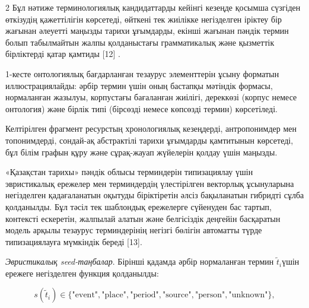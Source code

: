 \begin{multicols}{2}
Бұл нәтиже терминологиялық кандидаттарды кейінгі кезеңде қосымша
сүзгіден өткізудің қажеттілігін көрсетеді, өйткені тек жиілікке
негізделген іріктеу бір жағынан әлеуетті маңызды тарихи ұғымдарды,
екінші жағынан пәндік термин болып табылмайтын жалпы қолданыстағы
грамматикалық және қызметтік бірліктерді қатар қамтиды {[}12{]} .

1-кесте онтологиялық бағдарланған тезаурус элементтерін ұсыну форматын
иллюстрациялайды: әрбір термин үшін оның бастапқы мәтіндік формасы,
нормаланған жазылуы, корпустағы бағаланған жиілігі, дереккөзі (корпус
немесе онтология) және бірлік типі (бірсөзді немесе көпсөзді термин)
көрсетіледі.

Келтірілген фрагмент ресурстың хронологиялық кезеңдерді, антропонимдер
мен топонимдерді, сондай-ақ абстрактілі тарихи ұғымдарды қамтитынын
көрсетеді, бұл білім графын құру және сұрақ-жауап жүйелерін қолдау үшін
маңызды.

«Қазақстан тарихы» пәндік облысы терминдерін типизациялау үшін
эвристикалық ережелер мен терминдердің үлестірілген векторлық
ұсынуларына негізделген қадағаланатын оқытуды біріктіретін әлсіз
бақыланатын гибридті сұлба қолданылды. Бұл тәсіл тек шаблондық
ережелерге сүйенуден бас тартып, контексті ескеретін, жалпылай алатын
және белгісіздік деңгейін басқаратын модель арқылы тезаурус
терминдерінің негізгі бөлігін автоматты түрде типизациялауға мүмкіндік
береді {[}13{]}.

\emph{Эвристикалық seed-таңбалар}. Бірінші қадамда әрбір нормаланған
термин \({\widetilde{t}}_{i}\)үшін ережеге негізделген функция
қолданылды:
\end{multicols}
\vspace{-1em}
\begin{equation*}
s({\widetilde{t}}_{i}) \in \{\text{"event"},\text{"place"},\text{"period"},\text{"source"},\text{"person"},\text{"unknown"}\},
\end{equation*}

